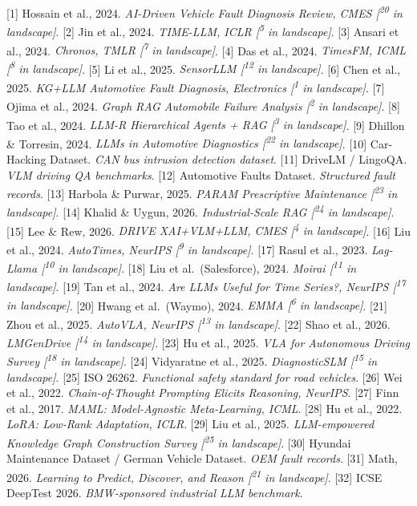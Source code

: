 \documentclass[
  11pt,
]{article}
\begin{document}
{[}1{]} Hossain et al., 2024. \emph{AI-Driven Vehicle Fault Diagnosis
Review, CMES {[}\textsuperscript{20} in landscape{]}}. {[}2{]} Jin et
al., 2024. \emph{TIME-LLM, ICLR {[}\textsuperscript{5} in landscape{]}}.
{[}3{]} Ansari et al., 2024. \emph{Chronos, TMLR {[}\textsuperscript{7}
in landscape{]}}. {[}4{]} Das et al., 2024. \emph{TimesFM, ICML
{[}\textsuperscript{8} in landscape{]}}. {[}5{]} Li et al., 2025.
\emph{SensorLLM {[}\textsuperscript{12} in landscape{]}}. {[}6{]} Chen
et al., 2025. \emph{KG+LLM Automotive Fault Diagnosis, Electronics
{[}\textsuperscript{1} in landscape{]}}. {[}7{]} Ojima et al., 2024.
\emph{Graph RAG Automobile Failure Analysis {[}\textsuperscript{2} in
landscape{]}}. {[}8{]} Tao et al., 2024. \emph{LLM-R Hierarchical Agents
+ RAG {[}\textsuperscript{3} in landscape{]}}. {[}9{]} Dhillon \&
Torresin, 2024. \emph{LLMs in Automotive Diagnostics
{[}\textsuperscript{22} in landscape{]}}. {[}10{]} Car-Hacking Dataset.
\emph{CAN bus intrusion detection dataset}. {[}11{]} DriveLM / LingoQA.
\emph{VLM driving QA benchmarks}. {[}12{]} Automotive Faults Dataset.
\emph{Structured fault records}. {[}13{]} Harbola \& Purwar, 2025.
\emph{PARAM Prescriptive Maintenance {[}\textsuperscript{23} in
landscape{]}}. {[}14{]} Khalid \& Uygun, 2026. \emph{Industrial-Scale
RAG {[}\textsuperscript{24} in landscape{]}}. {[}15{]} Lee \& Rew, 2026.
\emph{DRIVE XAI+VLM+LLM, CMES {[}\textsuperscript{4} in landscape{]}}.
{[}16{]} Liu et al., 2024. \emph{AutoTimes, NeurIPS
{[}\textsuperscript{9} in landscape{]}}. {[}17{]} Rasul et al., 2023.
\emph{Lag-Llama {[}\textsuperscript{10} in landscape{]}}. {[}18{]} Liu
et al.~(Salesforce), 2024. \emph{Moirai {[}\textsuperscript{11} in
landscape{]}}. {[}19{]} Tan et al., 2024. \emph{Are LLMs Useful for Time
Series?, NeurIPS {[}\textsuperscript{17} in landscape{]}}. {[}20{]}
Hwang et al.~(Waymo), 2024. \emph{EMMA {[}\textsuperscript{6} in
landscape{]}}. {[}21{]} Zhou et al., 2025. \emph{AutoVLA, NeurIPS
{[}\textsuperscript{13} in landscape{]}}. {[}22{]} Shao et al., 2026.
\emph{LMGenDrive {[}\textsuperscript{14} in landscape{]}}. {[}23{]} Hu
et al., 2025. \emph{VLA for Autonomous Driving Survey
{[}\textsuperscript{18} in landscape{]}}. {[}24{]} Vidyaratne et al.,
2025. \emph{DiagnosticSLM {[}\textsuperscript{15} in landscape{]}}.
{[}25{]} ISO 26262. \emph{Functional safety standard for road vehicles}.
{[}26{]} Wei et al., 2022. \emph{Chain-of-Thought Prompting Elicits
Reasoning, NeurIPS}. {[}27{]} Finn et al., 2017. \emph{MAML:
Model-Agnostic Meta-Learning, ICML}. {[}28{]} Hu et al., 2022.
\emph{LoRA: Low-Rank Adaptation, ICLR}. {[}29{]} Liu et al., 2025.
\emph{LLM-empowered Knowledge Graph Construction Survey
{[}\textsuperscript{25} in landscape{]}}. {[}30{]} Hyundai Maintenance
Dataset / German Vehicle Dataset. \emph{OEM fault records}. {[}31{]}
Math, 2026. \emph{Learning to Predict, Discover, and Reason
{[}\textsuperscript{21} in landscape{]}}. {[}32{]} ICSE DeepTest 2026.
\emph{BMW-sponsored industrial LLM benchmark}.
\end{document}
